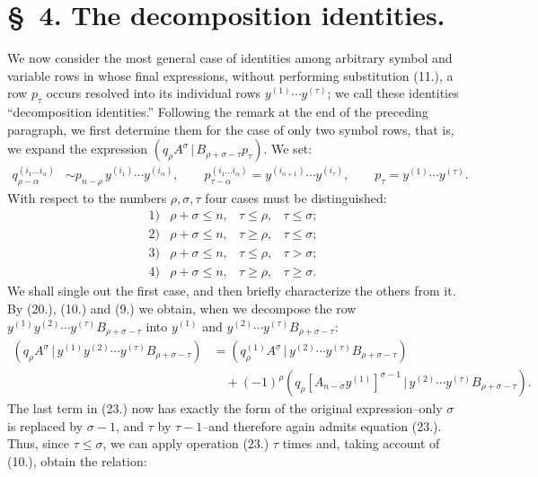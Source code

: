 \documentclass[11pt]{article}
\providecommand{\pair}[2]{(#1\,|\,#2)}
\begin{document}
\section*{\S\ 4. The decomposition identities.}
We now consider the most general case of identities among arbitrary symbol and variable rows in whose final expressions, without performing substitution (11.), a row $p_\tau$ occurs resolved into its individual rows $y^{(1)}\cdots y^{(\tau)}$; we call these identities ``decomposition identities.'' Following the remark at the end of the preceding paragraph, we first determine them for the case of only two symbol rows, that is, we expand the expression $\pair{q_\rho A^\sigma}{B_{\rho+\sigma-\tau}p_\tau}$. We set:
\begin{equation}
\begin{aligned}
q_{\rho-\alpha}^{(i_1\ldots i_\alpha)}&\sim p_{n-\rho}\,y^{(i_1)}\cdots y^{(i_\alpha)},\qquad
p_{\tau-\alpha}^{(i_1\ldots i_\alpha)}=y^{(i_{\alpha+1})}\cdots y^{(i_\tau)},\qquad
p_\tau=y^{(1)}\cdots y^{(\tau)}.
\end{aligned}
\tag{22}
\end{equation}
With respect to the numbers $\rho,\sigma,\tau$ four cases must be distinguished:
\[
\begin{array}{llll}
1)&\rho+\sigma\le n,& \tau\le\rho,& \tau\le\sigma;\\[2pt]
2)&\rho+\sigma\le n,& \tau\ge\rho,& \tau\le\sigma;\\[2pt]
3)&\rho+\sigma\le n,& \tau\le\rho,& \tau>\sigma;\\[2pt]
4)&\rho+\sigma\le n,& \tau\ge\rho,& \tau\ge\sigma.
\end{array}
\]
We shall single out the first case, and then briefly characterize the others from it. By (20.), (10.) and (9.) we obtain, when we decompose the row $y^{(1)}y^{(2)}\cdots y^{(\tau)}B_{\rho+\sigma-\tau}$ into $y^{(1)}$ and $y^{(2)}\cdots y^{(\tau)}B_{\rho+\sigma-\tau}$:
\begin{equation}
\begin{aligned}
\pair{q_\rho A^\sigma}{y^{(1)}y^{(2)}\cdots y^{(\tau)}B_{\rho+\sigma-\tau}}
&=\pair{q_\rho^{(1)}A^\sigma}{y^{(2)}\cdots y^{(\tau)}B_{\rho+\sigma-\tau}}\\
&\quad+(-1)^\rho\pair{q_\rho[A_{n-\sigma}y^{(1)}]^{\sigma-1}}{y^{(2)}\cdots y^{(\tau)}B_{\rho+\sigma-\tau}}.
\end{aligned}
\tag{23}
\end{equation}
The last term in (23.) now has exactly the form of the original expression--only $\sigma$ is replaced by $\sigma-1$, and $\tau$ by $\tau-1$--and therefore again admits equation (23.). Thus, since $\tau\le\sigma$, we can apply operation (23.) $\tau$ times and, taking account of (10.), obtain the relation:
\end{document}
